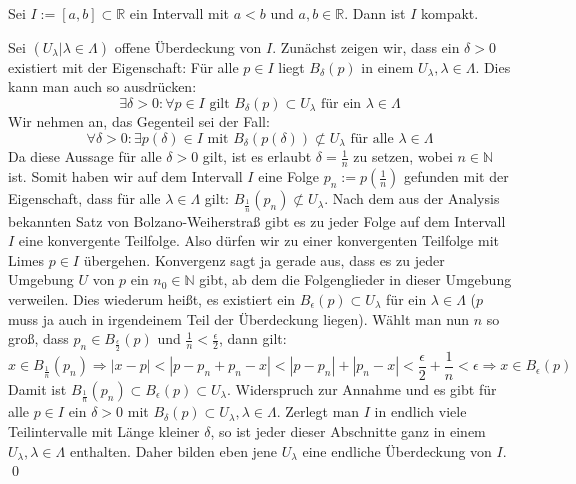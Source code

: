 \begin{Satz}\label{satz:intervall}
	Sei \(I := [ a , b ] \subset \mathbb{R}\) ein Intervall mit \(a<b\) und \(a,b \in \mathbb{R}\). Dann 
	ist \(I\) kompakt.
\end{Satz}
	Sei \( (U_{\lambda} | \lambda \in \Lambda) \) offene Überdeckung von \(I\). Zunächst zeigen wir,
	dass ein \(\delta > 0\) existiert mit der Eigenschaft: Für alle \(p \in I\) liegt \(B_{\delta}(p)\)
	in einem \(U_{\lambda}, \lambda \in \Lambda\). Dies kann man auch so ausdrücken: 
	\[ \exists \delta > 0 : \forall p \in I \mbox{ gilt } B_{\delta}(p) \subset U_{\lambda} \mbox { für ein } \lambda \in \Lambda \]
	Wir nehmen an, das Gegenteil sei der Fall:
	\[ \forall \delta > 0 : \exists p(\delta) \in I \mbox{ mit } B_{\delta}(p(\delta)) \not\subset U_{\lambda} \mbox { für alle } \lambda \in \Lambda \]
	Da diese Aussage für alle \(\delta > 0\) gilt, ist es erlaubt \(\delta = \frac{1}{n}\) zu setzen, wobei \(n \in \mathbb{N}\) ist.
	Somit haben wir auf dem Intervall \(I\) eine Folge \(p_{n} := p(\frac{1}{n})\) gefunden mit der Eigenschaft, dass für alle \(\lambda \in \Lambda\)
	gilt: \(B_{\frac{1}{n}}(p_{n}) \not\subset U_{\lambda}\). Nach dem aus der Analysis bekannten Satz von Bolzano-Weiherstraß gibt
	es zu jeder Folge auf dem Intervall \(I\) eine konvergente Teilfolge. Also dürfen wir zu einer konvergenten Teilfolge mit Limes \(p \in I\) übergehen.
  Konvergenz sagt ja gerade aus, dass es zu jeder Umgebung \(U\) von \(p\) ein \(n_0 \in \mathbb{N}\) gibt, 
	ab dem die Folgenglieder in dieser Umgebung verweilen. Dies wiederum heißt, es existiert ein \(B_{\epsilon}(p) \subset U_{\lambda}\) für ein \(\lambda \in \Lambda\)
	(\(p\) muss ja auch in irgendeinem Teil der Überdeckung liegen). Wählt man nun \(n\) so groß, dass \(p_n \in B_{\frac{\epsilon}{2}}(p)\) und \(\frac{1}{n} < \frac{\epsilon}{2}\),
	dann gilt:
	\[ x \in B_{\frac{1}{n}}(p_n) \Rightarrow |x-p| < |p-p_n+p_n-x| < |p-p_n| + |p_n-x| < \frac{\epsilon}{2} + \frac{1}{n} < \epsilon \Rightarrow x \in B_{\epsilon}(p) \]
	Damit ist \(B_{\frac{1}{n}}(p_n) \subset B_{\epsilon}(p) \subset U_{\lambda}\).
	Widerspruch zur Annahme und es gibt für alle \(p \in I\) ein \(\delta > 0\) mit \(B_{\delta}(p) \subset U_{\lambda}, \lambda \in \Lambda\).
	Zerlegt man \(I\) in endlich viele Teilintervalle mit Länge kleiner \(\delta\), so ist jeder dieser Abschnitte ganz in einem \(U_{\lambda}, \lambda \in \Lambda\)
	enthalten. Daher bilden eben jene \(U_{\lambda}\) eine endliche Überdeckung von \(I\).
\qed

